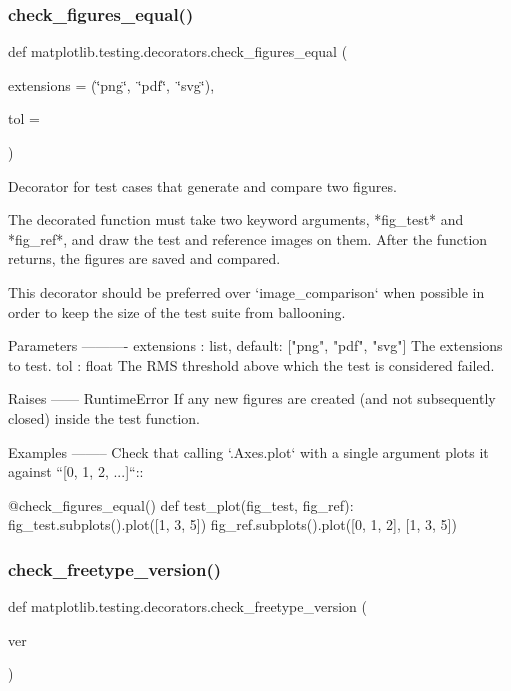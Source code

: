 \subsubsection{\texorpdfstring{check\+\_\+figures\+\_\+equal()}{check\_figures\_equal()}}
{\footnotesize\ttfamily def matplotlib.\+testing.\+decorators.\+check\+\_\+figures\+\_\+equal (\begin{DoxyParamCaption}\item[{}]{extensions = {\ttfamily (\char`\"{}png\char`\"{},~\char`\"{}pdf\char`\"{},~\char`\"{}svg\char`\"{})},  }\item[{}]{tol = {} }\end{DoxyParamCaption})}

\begin{DoxyVerb}Decorator for test cases that generate and compare two figures.

The decorated function must take two keyword arguments, *fig_test*
and *fig_ref*, and draw the test and reference images on them.
After the function returns, the figures are saved and compared.

This decorator should be preferred over `image_comparison` when possible in
order to keep the size of the test suite from ballooning.

Parameters
----------
extensions : list, default: ["png", "pdf", "svg"]
    The extensions to test.
tol : float
    The RMS threshold above which the test is considered failed.

Raises
------
RuntimeError
    If any new figures are created (and not subsequently closed) inside
    the test function.

Examples
--------
Check that calling `.Axes.plot` with a single argument plots it against
``[0, 1, 2, ...]``::

    @check_figures_equal()
    def test_plot(fig_test, fig_ref):
        fig_test.subplots().plot([1, 3, 5])
        fig_ref.subplots().plot([0, 1, 2], [1, 3, 5])\end{DoxyVerb}
 \mbox{\label{namespacematplotlib_1_1testing_1_1decorators_ae29d25a87e06d278ca1ec28163c6d526}} 
\subsubsection{\texorpdfstring{check\+\_\+freetype\+\_\+version()}{check\_freetype\_version()}}
{\footnotesize\ttfamily def matplotlib.\+testing.\+decorators.\+check\+\_\+freetype\+\_\+version (\begin{DoxyParamCaption}\item[{}]{ver }\end{DoxyParamCaption})}

